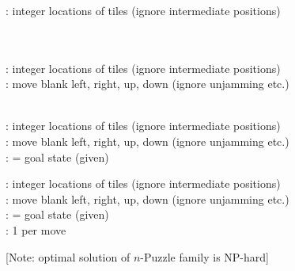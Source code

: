 \documentclass{article}
\begin{document}
\begin{huge}
\\
\\
\\





\textwidth
{}

: integer locations of tiles (ignore intermediate positions)\\
\\
\\


\textwidth
{}

: integer locations of tiles (ignore intermediate positions)\\
: move blank left, right, up, down (ignore unjamming etc.)\\
\\


\textwidth
{}

: integer locations of tiles (ignore intermediate positions)\\
: move blank left, right, up, down (ignore unjamming etc.)\\
: = goal state (given)\\


\textwidth
{}

: integer locations of tiles (ignore intermediate positions)\\
: move blank left, right, up, down (ignore unjamming etc.)\\
: = goal state (given)\\
: 1 per move

[Note: optimal solution of $n$-Puzzle family is NP-hard]




\end{huge}
\end{document}
